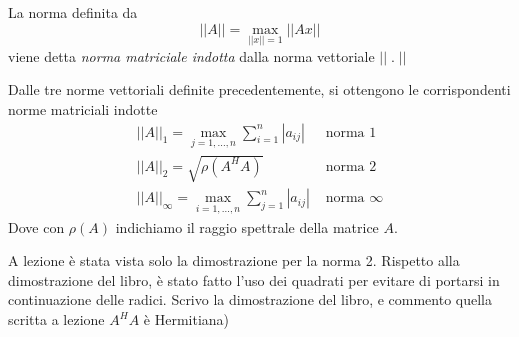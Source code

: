 \begin{defn}
 La norma definita da
 $$ ||A|| = \displaystyle \max_{||x||=1} ||Ax||$$
viene detta \emph{norma matriciale indotta} dalla norma vettoriale $||\; . \;||$
\end{defn}

\begin{theo}
Dalle tre norme vettoriali definite precedentemente, si ottengono
le corrispondenti norme matriciali indotte
$$
\begin{array}{ll}
 || A ||_{1} = \displaystyle \max_{j=1, \ldots, n} \displaystyle \sum_{i=1}^{n}|a_{ij}|
    & \text{ norma } 1 \\
 || A ||_{2} =  \sqrt{\rho(A^H A)} &
  \text{ norma } 2 \\
 || A ||_{\infty}  =  \displaystyle \max_{i=1,\ldots, n} \displaystyle \sum_{j=1}^{n}|a_{ij}| 
& \text{ norma } \infty
\end{array}
$$
Dove con $\rho(A)$ indichiamo il raggio spettrale della matrice $A$.
\end{theo}
\begin{notes}
 A lezione \`e stata vista solo la dimostrazione per la norma 2.
 Rispetto alla dimostrazione del libro, \`e stato fatto l'uso dei
quadrati per evitare di portarsi in continuazione delle radici.
 Scrivo la dimostrazione del libro, e commento quella scritta a
lezione
$A^{H}A$ \`e Hermitiana)
% 
\end{notes}

